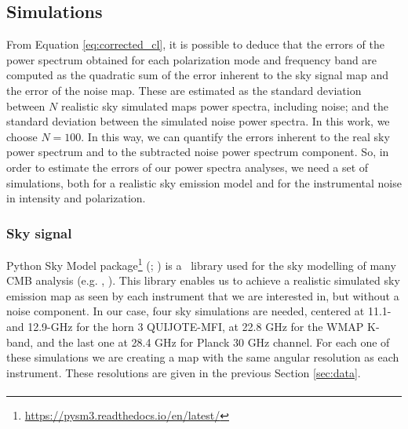 \subsection{Simulations}
\label{sec:simulations}

From Equation \ref{eq:corrected_cl}, it is possible to deduce that the errors of the power spectrum obtained for each polarization mode and frequency band are computed as the quadratic sum of the error inherent to the sky signal map and the error of the noise map. These are estimated as the standard deviation between $N$ realistic sky simulated maps power spectra, including noise; and the standard deviation between the simulated noise power spectra. In this work, we choose $N=100$. In this way, we can quantify the errors inherent to the real sky power spectrum and to the subtracted noise power spectrum component. So, in order to estimate the errors of our power spectra analyses, we need a set of simulations, both for a realistic sky emission model and for the instrumental noise in intensity and polarization. 


\subsubsection{Sky signal}
\label{sec:sky_simulations}

Python Sky Model package\footnote{\url{https://pysm3.readthedocs.io/en/latest/}} (\pysm; \citealp{Pysm}) is a \python\ library used for the sky modelling of many CMB analysis (e.g. \citealp{Planck_2020_cc}, \citealp{Martire_2022}). This library enables us to achieve a realistic simulated sky emission map as seen by 
each instrument that we are interested in, but without a noise component. In our case, four sky simulations are needed, centered at 11.1- and 12.9-GHz for the horn 3 QUIJOTE-MFI, at 22.8 GHz for the WMAP K-band, and the last one at 28.4 GHz for Planck 30 GHz channel. For each one of these simulations we are creating a map with the same angular resolution as each instrument. These resolutions are given in the previous Section \ref{sec:data}.
\paragraph*{}

